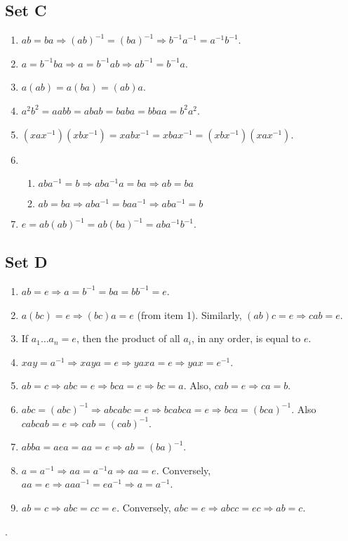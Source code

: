 \subsection{Set C}
\begin{enumerate}
    \item $ab = ba \Rightarrow (ab)^{-1} = (ba)^{-1} \Rightarrow b^{-1}a^{-1} = a^{-1}b^{-1}$.
    \item $a = b^{-1}ba \Rightarrow a = b^{-1}ab \Rightarrow ab^{-1} = b^{-1}a$.
    \item $a(ab) = a(ba) = (ab)a$.
    \item $a^2b^2 = aabb = abab = baba = bbaa = b^2a^2$.
    \item $(xax^{-1})(xbx^{-1}) = xabx^{-1} = xbax^{-1} = (xbx^{-1})(xax^{-1})$.
    \item 
        \begin{enumerate}
            \item $ aba^{-1} = b \Rightarrow aba^{-1}a = ba \Rightarrow ab = ba $

            \item $ ab = ba \Rightarrow aba^{-1} = baa^{-1} \Rightarrow aba^{-1} = b $
        \end{enumerate}
    \item $e = ab(ab)^{-1} = ab(ba)^{-1} = aba^{-1}b^{-1}$.
\end{enumerate}

\subsection{Set D}
\begin{enumerate}
    \item $ab = e \Rightarrow a = b^{-1} = ba = bb^{-1} = e$.
    \item $a(bc) = e \Rightarrow (bc)a = e$ (from item 1). Similarly, $(ab)c = e \Rightarrow cab = e$.
    \item If $a_1\ldots a_n = e$, then the product of all $a_i$, in any order, is equal to $e$.
    \item $xay = a^{-1} \Rightarrow xaya = e \Rightarrow yaxa = e \Rightarrow yax = e^{-1}$.
    \item $ab = c \Rightarrow abc = e \Rightarrow bca = e \Rightarrow bc = a$. Also, $cab = e \Rightarrow ca = b$.
    \item $abc = (abc)^{-1} \Rightarrow abcabc = e \Rightarrow bcabca = e \Rightarrow bca = (bca)^{-1}$. Also $cabcab = e \Rightarrow cab = (cab)^{-1}$.
    \item $abba = aea = aa = e \Rightarrow ab = (ba)^{-1}$.
    \item $a = a^{-1} \Rightarrow aa = a^{-1}a \Rightarrow aa = e$. Conversely, $aa = e \Rightarrow aaa^{-1} = ea^{-1} \Rightarrow a = a^{-1}$.
    \item $ab = c \Rightarrow abc = cc = e$. Conversely, $abc = e \Rightarrow abcc = ec \Rightarrow ab = c$.
\end{enumerate}.

